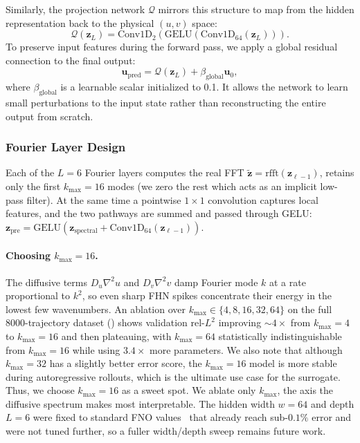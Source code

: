 \documentclass[runningheads]{llncs}
\begin{document}
Similarly, the projection network $\mathcal{Q}$ mirrors this structure to map from the hidden representation back to the physical $(u, v)$ space:
\begin{equation}
    \mathcal{Q}(\bm{z}_L) = \text{Conv1D}_{2}\left(\text{GELU}\left(\text{Conv1D}_{64}(\bm{z}_L)\right)\right).
\end{equation}
To preserve input features during the forward pass, we apply a global residual connection to the final output:
\begin{equation}
    \bm{u}_{\text{pred}} = \mathcal{Q}(\bm{z}_L) + \beta_{\text{global}} \bm{u}_0,
\end{equation}
where $\beta_{\text{global}}$ is a learnable scalar initialized to 0.1. It allows the network to learn small perturbations to the input state rather than reconstructing the entire output from scratch.


\subsubsection{Fourier Layer Design}
\label{sec:fourier_layer_design}

Each of the $L = 6$ Fourier layers computes the real FFT $\tilde{\bm{z}} = \text{rfft}(\bm{z}_{\ell-1})$, retains only the first $k_{\max} = 16$ modes (we zero the rest which acts as an implicit low-pass filter). At the same time a pointwise $1\times1$ convolution captures local features, and the two pathways are summed and passed through GELU: $\bm{z}_{\text{pre}} = \text{GELU}(\bm{z}_{\text{spectral}} + \text{Conv1D}_{64}(\bm{z}_{\ell-1}))$.

\paragraph{Choosing $k_{\max}{=}16$.} The diffusive terms $D_u \nabla^2 u$ and $D_v \nabla^2 v$ damp Fourier mode $k$ at a rate proportional to $k^2$, so even sharp FHN spikes concentrate their energy in the lowest few wavenumbers. An ablation over $k_{\max} \in \{4, 8, 16, 32, 64\}$ on the full 8000-trajectory dataset () shows validation rel-$L^2$ improving $\sim 4{\times}$ from $k_{\max}=4$ to $k_{\max}=16$ and then plateauing, with $k_{\max}=64$ statistically indistinguishable from $k_{\max}=16$ while using $3.4{\times}$ more parameters. We also note that although $k_{\max}=32$ has a slightly better error score, the $k_{\max}=16$ model is more stable during autoregressive rollouts, which is the ultimate use case for the surrogate. Thus, we choose $k_{\max} = 16$ as a sweet spot. We ablate only $k_{\max}$, the axis the diffusive spectrum makes most interpretable. The hidden width $w = 64$ and depth $L = 6$ were fixed to standard FNO values~\cite{li2021fourierneuraloperatorparametric} that already reach sub-$0.1\%$ error and were not tuned further, so a fuller width/depth sweep remains future work.
\end{document}
